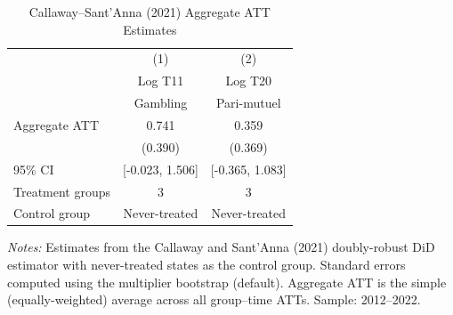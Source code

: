 \begin{table}[htbp]
\centering
\caption{Callaway--Sant'Anna (2021) Aggregate ATT Estimates}
\label{tab:csdid}
\begin{tabular}{lcc}
\hline\hline
 & (1) & (2) \\
 & Log T11 & Log T20 \\
 & Gambling & Pari-mutuel \\
\hline
Aggregate ATT & 0.741 & 0.359 \\
 & (0.390) & (0.369) \\
95\% CI & [-0.023, 1.506] & [-0.365, 1.083] \\
\hline
Treatment groups & 3 & 3 \\
Control group & Never-treated & Never-treated \\
\hline\hline
\end{tabular}
\begin{minipage}{0.85\textwidth}
\vspace{0.3em}
\footnotesize \textit{Notes:} Estimates from the Callaway and Sant'Anna (2021) doubly-robust DiD estimator with never-treated states as the control group. Standard errors computed using the multiplier bootstrap (default). Aggregate ATT is the simple (equally-weighted) average across all group--time ATTs. Sample: 2012--2022.
\end{minipage}
\end{table}

